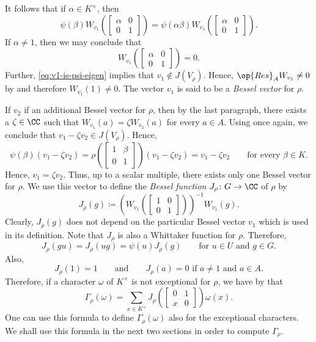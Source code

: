 \documentclass[../main.tex]{subfiles}
\begin{document}
It follows that if $\alpha\in K^\times$, then
\[\psi(\beta)W_{v_1}\left(\begin{bmatrix}
	\alpha & 0 \\
	0 & 1
\end{bmatrix}\right)=\psi(\alpha\beta)W_{v_1}\left(\begin{bmatrix}
	\alpha & 0 \\
	0 & 1
\end{bmatrix}\right).\]
If $\alpha\ne1$, then we may conclude that
\[W_{v_1}\left(\begin{bmatrix}
	\alpha & 0 \\
	0 & 1
\end{bmatrix}\right)=0.\]
Further, \eqref{eq:v1-is-psi-eigen} implies that $v_1\notin J(V_\rho)$. Hence, $\op{Res}_AW_{v_1}\ne0$ by  and therefore $W_{v_1}(1)\ne0$. The vector $v_1$ is said to be a \textit{Bessel vector} for $\rho$.

If $v_2$ if an additional Bessel vector for $\rho$, then by the last paragraph, there exists a $\zeta\in\CC$ such that $W_{v_1}(a)=\zeta W_{v_2}(a)$ for every $a\in A$. Using  once again, we conclude that $v_1-\zeta v_2\in J(V_\rho)$. Hence,
\[\psi(\beta)(v_1-\zeta v_2)=\rho\left(\begin{bmatrix}
	1 & \beta \\
	0 & 1
\end{bmatrix}\right)(v_1-\zeta v_2)=v_1-\zeta v_2\qquad\text{for every }\beta\in K.\]
Hence, $v_1=\zeta v_2$. Thus, up to a scalar multiple, there exists only one Bessel vector for $\rho$. We use this vector to define the \textit{Bessel function} $J_\rho\colon G\to\CC$ of $\rho$ by
\[J_\rho(g)\coloneqq\left(W_{v_1}\left(\begin{bmatrix}
	1 & 0 \\
	0 & 1
\end{bmatrix}\right)\right)^{-1}W_{v_1}(g).\]
Clearly, $J_\rho(g)$ does not depend on the particular Bessel vector $v_1$ which is used in its definition. Note that $J_\rho$ is also a Whittaker function for $\rho$. Therefore,
\[J_\rho(gu)=J_\rho(ug)=\psi(u)J_\rho(g)\qquad\text{for }u\in U\text{ and }g\in G.\]
Also,
\[J_\rho(1)=1\qquad\text{and}\qquad J_\rho(a)=0\text{ if }a\ne1\text{ and }a\in A.\]
Therefore, if a character $\omega$ of $K^\times$ is not exceptional for $\rho$, we have by  that
\[\Gamma_\rho(\omega)=\sum_{x\in K^\times}J_\rho\left(\begin{bmatrix}
	0 & 1 \\
	x & 0
\end{bmatrix}\right)\omega(x).\]
One can use this formula to define $\Gamma_\rho(\omega)$ also for the exceptional characters. We shall use this formula in the next two sections in order to compute $\Gamma_\rho$.
\end{document}
